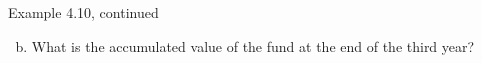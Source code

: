 \documentclass{beamer}
\begin{document}
\begin{frame}{Example 4.10, continued}

\begin{enumerate}[a)]
\setcounter{enumi}{1}
\item What is the accumulated value of the fund at the end of the third year?
\end{enumerate}

\vfill
\end{frame}
\end{document}
